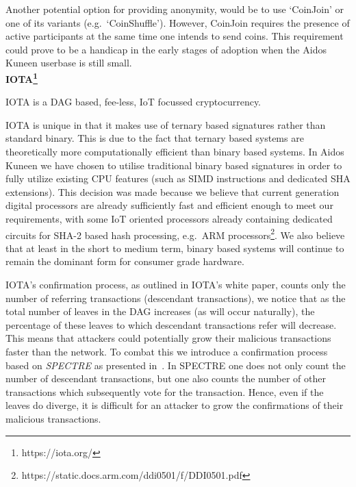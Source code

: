 \documentclass[a4paper,10pt,twocolumn]{article}
\begin{document}
	Another potential option for providing anonymity, would be to use `CoinJoin' or one of its variants (e.g.\ `CoinShuffle'). However, 
	CoinJoin requires the presence of active participants at the same time one intends to send coins. This requirement could prove to be a 
	handicap in the early stages of adoption when the Aidos Kuneen userbase is still small. 
	\\
	
	\noindent
	{\bf IOTA\footnote{https://iota.org/}}
	
	IOTA is a DAG based, fee-less, IoT focussed cryptocurrency.
	
	IOTA is unique in that it makes use of ternary based signatures rather than standard binary. This is due to the fact that ternary based 
	systems are theoretically more computationally efficient than binary based systems. In Aidos Kuneen we have chosen to utilise 
	traditional binary based signatures in order to fully utilize existing CPU features (such as SIMD instructions and dedicated SHA 
	extensions). This decision was made because we believe that current generation digital processors are already sufficiently fast and 
	efficient enough to meet our requirements, with some IoT oriented processors already containing dedicated circuits for 
	SHA-2 based hash processing, e.g.~ARM processors\footnote{https://static.docs.arm.com/ddi0501/f/DDI0501.pdf}. We also believe that at 
	least in the short to medium term, binary based systems will continue to remain the dominant form for consumer grade hardware.
	
	\vspace{2.5mm}
	
	IOTA's confirmation process, as outlined in IOTA's white paper, counts only the number of referring transactions 
	(descendant transactions), we notice that as the total number of leaves in the DAG increases (as will occur naturally), 
	the percentage of these leaves to which descendant transactions refer will decrease.
	This means that attackers could potentially grow their malicious
	transactions faster than the network. To combat this we introduce a confirmation process based on \emph{SPECTRE} as presented 
	in~\cite{spectre}. In SPECTRE one does not only count the number of descendant transactions, but one also counts the number of other 
	transactions which subsequently vote for the transaction. Hence, even if the leaves do diverge, it is difficult for an attacker to grow 
	the confirmations of their malicious transactions.
	
	\vspace{2.5mm}
	
\end{document}
